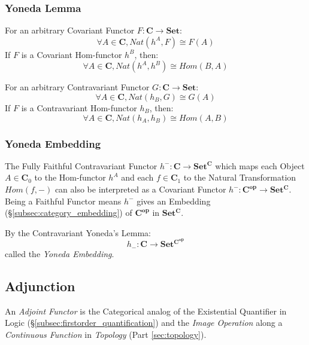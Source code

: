 \subsubsection{Yoneda Lemma}\label{subsec:yoneda_lemma}

For an arbitrary Covariant Functor $F : \mathbf{C} \rightarrow
\mathbf{Set}$:
\[
    \forall A \in \mathbf{C}, Nat(h^A,F) \cong F(A)
\]
If $F$ is a Covariant Hom-functor $h^B$, then:
\[
    \forall A \in \mathbf{C}, Nat(h^A,h^B) \cong Hom(B,A)
\]

For an arbitrary Contravariant Functor $G : \mathbf{C} \rightarrow
\mathbf{Set}$:
\[
    \forall A \in \mathbf{C}, Nat(h_B,G) \cong G(A)
\]
If $F$ is a Contravariant Hom-functor $h_B$, then:
\[
    \forall A \in \mathbf{C}, Nat(h_A,h_B) \cong Hom(A,B)
\]



\subsubsection{Yoneda Embedding}\label{subsec:yoneda_embedding}

The Fully Faithful Contravariant Functor $h^- : \mathbf{C} \rightarrow
\mathbf{Set^C}$ which maps each Object $A \in \mathbf{C}_0$ to the
Hom-functor $h^A$ and each $f \in \mathbf{C}_1$ to the Natural
Transformation $Hom(f,-)$ can also be interpreted as a Covariant
Functor $h^- : \mathbf{C^{op}} \rightarrow \mathbf{Set^C}$. Being a
Faithful Functor means $h^-$ gives an Embedding
(\S\ref{subsec:category_embedding}) of $\mathbf{C^{op}}$ in
$\mathbf{Set^C}$.

By the Contravariant Yoneda's Lemma:
\[
    h_-: \mathbf{C} \rightarrow \mathbf{Set^{C^{op}}}
\]
called the \emph{Yoneda Embedding}.



\subsection{Adjunction}\label{subsec:adjunction}

An \emph{Adjoint Functor} is the Categorical analog of the Existential
Quantifier in Logic (\S\ref{subsec:firstorder_quantification}) and the
\emph{Image Operation} along a \emph{Continuous Function} in
\emph{Topology} (Part \ref{sec:topology}).



